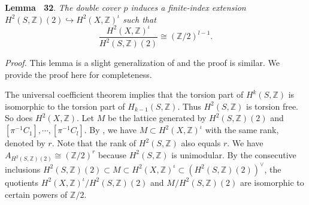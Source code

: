 \documentclass[
]{article}
\begin{document}
\textbf{Lemma~ 32}. \emph{\label{lemma: double cover manifold} The
double cover \(p\) induces a finite-index extension
\(H^2(S,\mathbb{Z})(2)\hookrightarrow H^2(X,\mathbb{Z})^\iota\) such
that
\[\frac{H^2(X,\mathbb{Z})^\iota}{H^2(S,\mathbb{Z})(2)}\cong (\mathbb{Z}/2)^{l-1}.\]}

\emph{Proof.} This lemma is a slight generalization of
\cite[Prop $3.4$]{yu2023moduli} and the proof is similar. We provide the
proof here for completeness.

The universal coefficient theorem implies that the torsion part of
\(H^k(S,\mathbb{Z})\) is isomorphic to the torsion part of
\(H_{k-1}(S,\mathbb{Z})\). Thus \(H^2(S,\mathbb{Z})\) is torsion free.
So does \(H^2(X,\mathbb{Z})\). Let \(M\) be the lattice generated by
\(H^2(S,\mathbb{Z})(2)\) and \([\pi^{-1}C_1],\cdots,[\pi^{-1}C_l]\). By
\cite[Lemma $3.3$]{yu2023moduli}, we have
\(M\subset H^2(X,\mathbb{Z})^\iota\) with the same rank, denoted by
\(r\). Note that the rank of \(H^2(S,\mathbb{Z})\) also equals \(r\). We
have \(A_{H^2(S,\mathbb{Z})(2)}\cong (\mathbb{Z}/2)^{r}\) because
\(H^2(S,\mathbb{Z})\) is unimodular. By the consecutive inclusions
\(H^2(S,\mathbb{Z})(2)\subset M\subset H^2(X,\mathbb{Z})^\iota\subset (H^2(S,\mathbb{Z})(2))^{\vee}\),
the quotients \(H^2(X,\mathbb{Z})^\iota/H^2(S,\mathbb{Z})(2)\) and
\(M/H^2(S,\mathbb{Z})(2)\) are isomorphic to certain powers of
\(\mathbb{Z}/2\).
\end{document}
